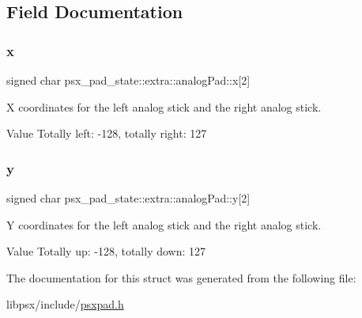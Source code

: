 \subsection{Field Documentation}
\mbox{\label{structpsx__pad__state_1_1extra_1_1analogPad_a9f1cce7fb30ad35f6b58a3f3219cbdc4}} 
\subsubsection{\texorpdfstring{x}{x}}
{\footnotesize\ttfamily signed char psx\+\_\+pad\+\_\+state\+::extra\+::analog\+Pad\+::x\mbox{[}2\mbox{]}}



X coordinates for the left analog stick and the right analog stick. 

\begin{DoxyParagraph}{Value }
Totally left\+: -\/128, totally right\+: 127 
\end{DoxyParagraph}
\mbox{\label{structpsx__pad__state_1_1extra_1_1analogPad_a4c3c2de2ba57dfb45bfc1d0d59a3d14a}} 
\subsubsection{\texorpdfstring{y}{y}}
{\footnotesize\ttfamily signed char psx\+\_\+pad\+\_\+state\+::extra\+::analog\+Pad\+::y\mbox{[}2\mbox{]}}



Y coordinates for the left analog stick and the right analog stick. 

\begin{DoxyParagraph}{Value }
Totally up\+: -\/128, totally down\+: 127 
\end{DoxyParagraph}


The documentation for this struct was generated from the following file\+:\begin{DoxyCompactItemize}
\item 
libpsx/include/\hyperlink{psxpad_8h}{psxpad.\+h}\end{DoxyCompactItemize}
